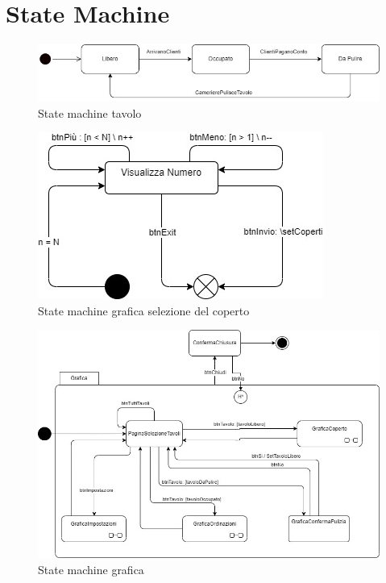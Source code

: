 \documentclass[12pt, letterpaper]{book}
\begin{document}
\section{State Machine}
\begin{figure}[H]
    \centering
    \includegraphics[width =0.6 \linewidth]{../UML/DrawIo/StateMachine/StateMachine-Tavolo.jpg}
    \caption{State machine tavolo}
    \label{UML: SM-Tavolo}
\end{figure}
\begin{figure}[H]
    \centering
    \includegraphics[width =0.4 \linewidth]{../UML/DrawIo/StateMachine/StateMachine-GraficaCoperto.jpg}
    \caption{State machine grafica selezione del coperto}
    \label{UML: SM-GraficaCoperto}
\end{figure}
\begin{figure}[h]
    \centering
    \includegraphics[width =1 \linewidth]{../UML/DrawIo/StateMachine/StateMachine-Grafica.jpg}
    \caption{State machine grafica}
    \label{UML: SM-grafica}
\end{figure}
\end{document}
